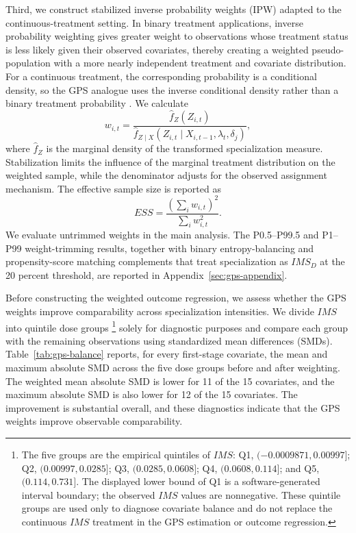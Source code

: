 \documentclass[11pt]{article}
\begin{document}
Third, we construct stabilized inverse probability weights (IPW) adapted to the continuous-treatment setting. In binary treatment applications, inverse probability weighting gives greater weight to observations whose treatment status is less likely given their observed covariates, thereby creating a weighted pseudo-population with a more nearly independent treatment and covariate distribution. For a continuous treatment, the corresponding probability is a conditional density, so the GPS analogue uses the inverse conditional density rather than a binary treatment probability \citep{imbens2000,hiranoimbens2004}. We calculate
\[
w_{i,t}=\frac{\widehat f_Z(Z_{i,t})}{\widehat f_{Z\mid X}(Z_{i,t}\mid X_{i,t-1},\lambda_t,\delta_j)},
\]
where \(\widehat f_Z\) is the marginal density of the transformed specialization measure. Stabilization limits the influence of the marginal treatment distribution on the weighted sample, while the denominator adjusts for the observed assignment mechanism. The effective sample size is reported as
\[
ESS=\frac{\left(\sum_i w_{i,t}\right)^2}{\sum_i w_{i,t}^2}.
\]
We evaluate untrimmed weights in the main analysis. 
The P0.5--P99.5 and P1--P99 weight-trimming results, together with binary entropy-balancing and propensity-score matching complements that treat specialization as \(IMS_D\) at the 20 percent threshold, are reported in Appendix~\ref{sec:gps-appendix}.

Before constructing the weighted outcome regression, we assess whether the GPS weights improve comparability across specialization intensities. 
We divide \(IMS\) into quintile dose groups \footnote{The five groups are the empirical quintiles of \(IMS\): Q1, \((-0.0009871,0.00997]\); Q2, \((0.00997,0.0285]\); Q3, \((0.0285,0.0608]\); Q4, \((0.0608,0.114]\); and Q5, \((0.114,0.731]\). The displayed lower bound of Q1 is a software-generated interval boundary; the observed \(IMS\) values are nonnegative. These quintile groups are used only to diagnose covariate balance and do not replace the continuous \(IMS\) treatment in the GPS estimation or outcome regression.}  solely for diagnostic purposes and compare each group with the remaining observations using standardized mean differences (SMDs). 
Table~\ref{tab:gps-balance} reports, for every first-stage covariate, the mean and maximum absolute SMD across the five dose groups before and after weighting. 
The weighted mean absolute SMD is lower for 11 of the 15 covariates, and the maximum absolute SMD is also lower for 12 of the 15 covariates. 
The improvement is substantial overall, and these diagnostics indicate that the GPS weights improve observable comparability.
\end{document}
